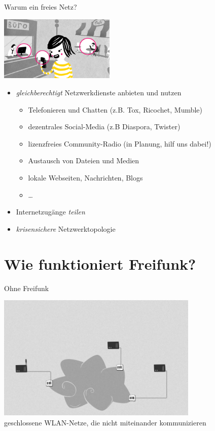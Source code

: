 \documentclass[10pt]{beamer}
\begin{document}
    \begin{frame}{Warum ein freies Netz?}
      \vfill
      \begin{center}
        \includegraphics[width=5.5cm]{images/verbindet}
      \end{center}

      \begin{itemize}
        \item \emph{gleichberechtigt} Netzwerkdienste anbieten und nutzen
        \begin{itemize}
          \item Telefonieren und Chatten (z.B. Tox, Ricochet, Mumble)
          \item dezentrales Social-Media (z.B Diaspora, Twister)
          \item lizenzfreies Community-Radio (in Planung, hilf uns dabei!)
          \item Austausch von Dateien und Medien
          \item lokale Webseiten, Nachrichten, Blogs
          \item \ldots
        \end{itemize}
        \item Internetzugänge \emph{teilen}
        \item \emph{krisensichere} Netzwerktopologie
      \end{itemize}
      \vfill
    \end{frame}

  \section{Wie funktioniert Freifunk?}

    \begin{frame}{Ohne Freifunk}
      \begin{center}
        \includegraphics[height=6cm]{images/network_1}\\
        \vspace{1em}
        geschlossene WLAN-Netze, die nicht miteinander kommunizieren
        \vspace{1em}
      \end{center}
    \end{frame}
\end{document}
